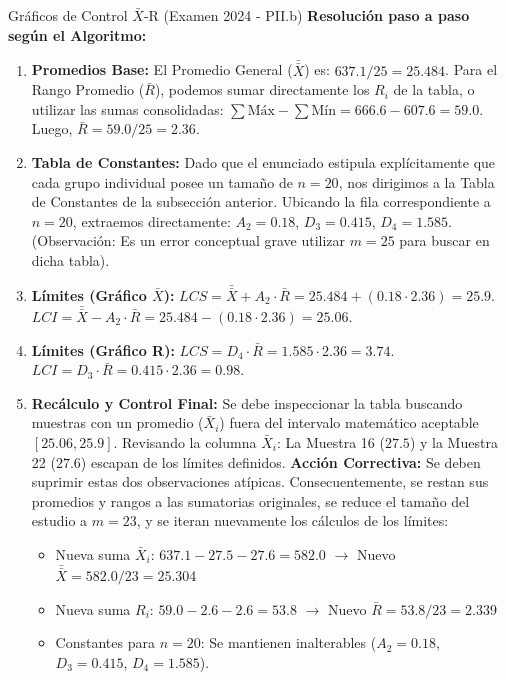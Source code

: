 \begin{ejercicio}{Gráficos de Control $\bar{X}$-R (Examen 2024 - PII.b)}
\textbf{Resolución paso a paso según el Algoritmo:}
\begin{enumerate}
    \item \textbf{Promedios Base:} 
    El Promedio General ($\bar{\bar{X}}$) es: $637.1 / 25 = 25.484$.
    Para el Rango Promedio ($\bar{R}$), podemos sumar directamente los $R_i$ de la tabla, o utilizar las sumas consolidadas: $\sum \text{Máx} - \sum \text{Mín} = 666.6 - 607.6 = 59.0$. Luego, $\bar{R} = 59.0 / 25 = 2.36$.
    \item \textbf{Tabla de Constantes:} Dado que el enunciado estipula explícitamente que cada grupo individual posee un tamaño de $n=20$, nos dirigimos a la Tabla de Constantes de la subsección anterior. Ubicando la fila correspondiente a $n=20$, extraemos directamente: $A_2 = 0.18$, $D_3 = 0.415$, $D_4 = 1.585$. (Observación: Es un error conceptual grave utilizar $m=25$ para buscar en dicha tabla).
    \item \textbf{Límites (Gráfico $\bar{X}$):} 
    $LCS = \bar{\bar{X}} + A_2 \cdot \bar{R} = 25.484 + (0.18 \cdot 2.36) = 25.9$.
    $LCI = \bar{\bar{X}} - A_2 \cdot \bar{R} = 25.484 - (0.18 \cdot 2.36) = 25.06$.
    \item \textbf{Límites (Gráfico R):}
    $LCS = D_4 \cdot \bar{R} = 1.585 \cdot 2.36 = 3.74$.
    $LCI = D_3 \cdot \bar{R} = 0.415 \cdot 2.36 = 0.98$.
    \item \textbf{Recálculo y Control Final:}
    Se debe inspeccionar la tabla buscando muestras con un promedio ($\bar{X}_i$) fuera del intervalo matemático aceptable $[25.06, 25.9]$.
    Revisando la columna $\bar{X}_i$: La Muestra 16 ($27.5$) y la Muestra 22 ($27.6$) escapan de los límites definidos.
    \textbf{Acción Correctiva:} Se deben suprimir estas dos observaciones atípicas. Consecuentemente, se restan sus promedios y rangos a las sumatorias originales, se reduce el tamaño del estudio a $m=23$, y se iteran nuevamente los cálculos de los límites:
    \begin{itemize}
        \item Nueva suma $\bar{X}_i$: $637.1 - 27.5 - 27.6 = 582.0$ \hspace{0.5cm} $\rightarrow$ \hspace{0.5cm} Nuevo $\bar{\bar{X}} = 582.0 / 23 = 25.304$
        \item Nueva suma $R_i$: $59.0 - 2.6 - 2.6 = 53.8$ \hspace{0.9cm} $\rightarrow$ \hspace{0.5cm} Nuevo $\bar{R} = 53.8 / 23 = 2.339$
        \item Constantes para $n=20$: Se mantienen inalterables ($A_2 = 0.18$, $D_3 = 0.415$, $D_4 = 1.585$).

\end{itemize}
\end{enumerate}
\end{ejercicio}
